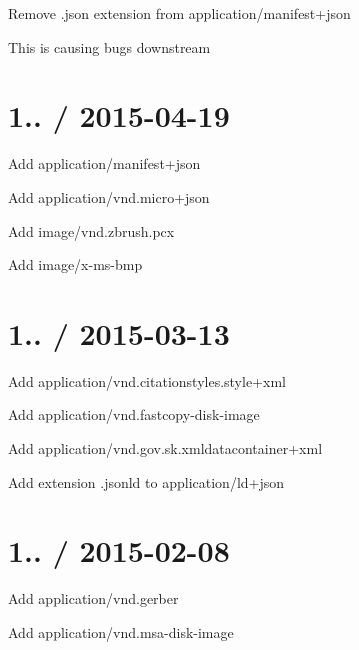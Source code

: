 \begin{DoxyItemize}
\item Remove {\ttfamily .json} extension from {\ttfamily application/manifest+json}
\begin{DoxyItemize}
\item This is causing bugs downstream
\end{DoxyItemize}
\end{DoxyItemize}

\section*{1.. / 2015-\/04-\/19 }


\begin{DoxyItemize}
\item Add {\ttfamily application/manifest+json}
\item Add {\ttfamily application/vnd.\+micro+json}
\item Add {\ttfamily image/vnd.\+zbrush.\+pcx}
\item Add {\ttfamily image/x-\/ms-\/bmp}
\end{DoxyItemize}

\section*{1.. / 2015-\/03-\/13 }


\begin{DoxyItemize}
\item Add {\ttfamily application/vnd.\+citationstyles.\+style+xml}
\item Add {\ttfamily application/vnd.\+fastcopy-\/disk-\/image}
\item Add {\ttfamily application/vnd.\+gov.\+sk.\+xmldatacontainer+xml}
\item Add extension {\ttfamily .jsonld} to {\ttfamily application/ld+json}
\end{DoxyItemize}

\section*{1.. / 2015-\/02-\/08 }


\begin{DoxyItemize}
\item Add {\ttfamily application/vnd.\+gerber}
\item Add {\ttfamily application/vnd.\+msa-\/disk-\/image}
\end{DoxyItemize}

